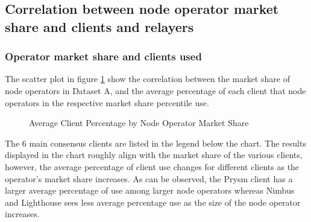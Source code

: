 \documentclass[conference]{IEEEtran}
\begin{document}
\subsection{Correlation between node operator market share and clients and relayers}

\subsubsection{Operator market share and clients used}

The scatter plot in figure \ref{fig:average_client_percentage_by_percentile} show the correlation between the market share of node operators in Dataset A, and the average percentage of each client that node operators in the respective market share percentile use.

\begin{figure}[htbp]
  \centering
  \caption{Average Client Percentage by Node Operator Market Share}
  \label{fig:average_client_percentage_by_percentile}
\end{figure}

The 6 main consensus clients are listed in the legend below the chart.  The results displayed in the chart roughly align with the market share of the various clients, however, the average percentage of client use changes for different clients as the operator's market share increases.  As can be observed, the Prysm client has a larger average percentage of use among larger node operators whereas Nimbus and Lighthouse sees less average percentage use as the size of the node operator increases.
\end{document}
